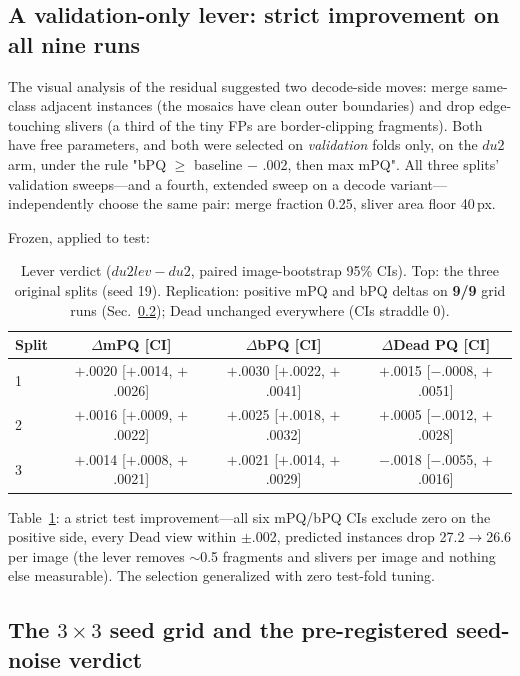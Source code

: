 \documentclass[11pt]{article}
\begin{document}
\subsection{A validation-only lever: strict improvement on all nine runs}
\label{sec:lever}

The visual analysis of the residual suggested two decode-side moves: merge same-class
adjacent instances (the mosaics have clean outer boundaries) and drop edge-touching slivers
(a third of the tiny FPs are border-clipping fragments). Both have free parameters, and both
were selected on \emph{validation} folds only, on the $du2$ arm, under the rule "bPQ
$\geq$ baseline $-$ .002, then max mPQ". All three splits' validation sweeps---and a fourth,
extended sweep on a decode variant---independently choose the same pair: merge fraction 0.25,
sliver area floor 40\,px.

Frozen, applied to test:

\begin{table}[t]
\centering\small
\caption{Lever verdict ($du2lev - du2$, paired image-bootstrap 95\% CIs). Top: the three
original splits (seed 19). Replication: positive mPQ and bPQ deltas on \textbf{9/9} grid runs
(Sec.~\ref{sec:grid}); Dead unchanged everywhere (CIs straddle 0).}
\label{tab:lever}
\begin{tabular}{lccc}
\toprule
Split & $\Delta$mPQ [CI] & $\Delta$bPQ [CI] & $\Delta$Dead PQ [CI] \\
\midrule
1 & $+$.0020 [$+$.0014, $+$.0026] & $+$.0030 [$+$.0022, $+$.0041] & $+$.0015 [$-$.0008, $+$.0051] \\
2 & $+$.0016 [$+$.0009, $+$.0022] & $+$.0025 [$+$.0018, $+$.0032] & $+$.0005 [$-$.0012, $+$.0028] \\
3 & $+$.0014 [$+$.0008, $+$.0021] & $+$.0021 [$+$.0014, $+$.0029] & $-$.0018 [$-$.0055, $+$.0016] \\
\bottomrule
\end{tabular}
\end{table}

Table~\ref{tab:lever}: a strict test improvement---all six mPQ/bPQ CIs exclude zero on the
positive side, every Dead view within $\pm$.002, predicted instances drop 27.2$\to$26.6 per
image (the lever removes $\sim$0.5 fragments and slivers per image and nothing else
measurable). The selection generalized with zero test-fold tuning.

\subsection{The $3{\times}3$ seed grid and the pre-registered seed-noise verdict}
\label{sec:grid}
\end{document}
